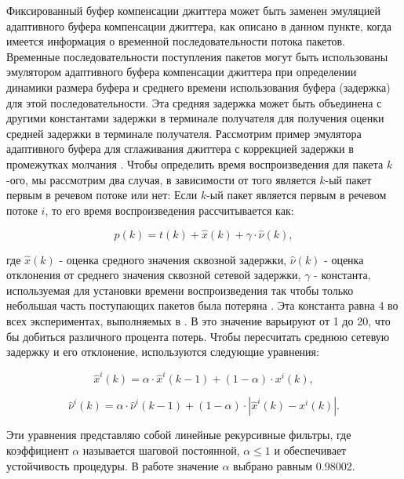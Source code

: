 Фиксированный буфер компенсации джиттера может быть заменен эмуляцией адаптивного буфера компенсации джиттера, как описано в данном пункте, когда имеется информация о временной последовательности потока пакетов. 
Временные последовательности поступления пакетов могут быть использованы эмулятором адаптивного буфера компенсации джиттера при определении динамики размера буфера и среднего времени использования буфера (задержка) для этой последовательности. Эта средняя задержка может быть объединена с другими константами задержки в терминале получателя для получения оценки средней задержки в терминале получателя. 
Рассмотрим пример эмулятора адаптивного буфера для сглаживания джиттера с коррекцией задержки в промежутках молчания \cite{Ramjee}. Чтобы определить время воспроизведения для пакета $k$-ого, мы рассмотрим два случая, в зависимости от того является $k$-ый пакет первым в речевом потоке или нет:
Если $k$-ый пакет является первым в речевом потоке $i$, то его время воспроизведения рассчитывается как:

\begin{equation}\label{eq3:playout}
p(k)=t(k)+\hat{x}(k)+\gamma\cdot\hat{\nu}(k),
\end{equation}

\noindent где $\hat{x}(k)$ - оценка средного значения сквозной задержки, $\hat{\nu}(k)$ - оценка отклонения от среднего значения сквозной сетевой задержки, $\gamma$ - константа, используемая для установки времени воспроизведения так чтобы только небольшая часть поступающих пакетов была потеряна \cite{Ramjee}. Эта константа равна 4 во всех экспериментах, выполняемых в \cite{Ramjee}. В \cite{Moon} это значение варьируют от 1 до 20, что бы добиться различного процента потерь. Чтобы пересчитать среднюю сетевую задержку и его отклонение, используются следующие уравнения:

\begin{equation}\label{eq3:playout_d}
\hat{x}^{i}(k)=\alpha\cdot\hat{x}^{i}(k-1)+(1-\alpha)\cdot x^{i}(k),
\end{equation}

\begin{equation}\label{eq3:playout_v}
\hat{\nu}^{i}(k)=\alpha\cdot\hat{\nu}^{i}(k-1)+(1-\alpha)\cdot | \hat{x}^{i}(k)-x^{i}(k) |.
\end{equation}

Эти уравнения представляю собой линейные рекурсивные фильтры, где коэффициент $\alpha$ называется шаговой постоянной, $\alpha\leq1$ и обеспечивает устойчивость процедуры. В работе \cite{Ramjee} значение $\alpha$ выбрано равным 0.98002. 

